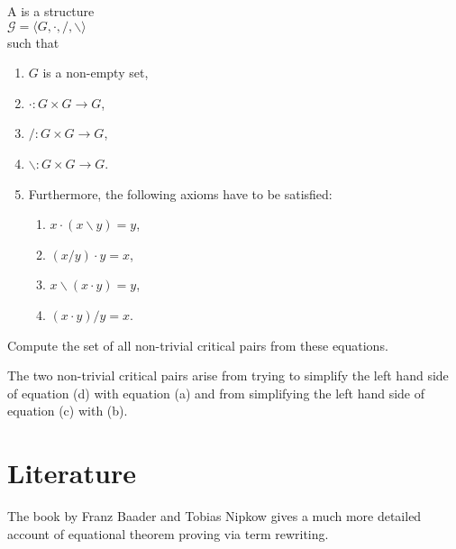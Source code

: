\exercise
A  is a structure
\\[0.2cm]
\hspace*{1.3cm}
$ \mathcal{G} = \langle G, \cdot, /, \backslash \rangle$
\\[0.2cm]
such that
\begin{enumerate}
\item $G$ is a non-empty set,
\item $\cdot: G \times G \rightarrow G$,
\item $/: G \times G \rightarrow G$,
\item $\backslash: G \times G \rightarrow G$.
\item Furthermore, the following axioms have to be satisfied:
      \begin{enumerate}
      \item $x \cdot (x \backslash y) = y$,
      \item $(x / y) \cdot y = x$,
      \item $x \backslash (x \cdot y) = y$,
      \item $(x \cdot y) /y = x$.
      \end{enumerate}  
\end{enumerate}
Compute the set of all non-trivial critical pairs from these equations.

\hint 
The two non-trivial critical pairs arise from trying to simplify the left hand side of equation (d) with equation (a)
and from simplifying the left hand side of equation (c) with (b).
\eoxs
    
\section{Literature}
The book  by Franz Baader and Tobias Nipkow \cite{baader:1998} gives a much
more detailed account of equational theorem proving via term rewriting.

